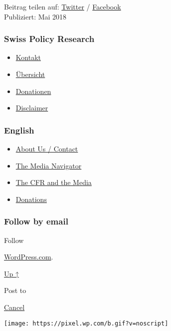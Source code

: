 Beitrag teilen auf:
\href{https://twitter.com/intent/tweet?url=https://swprs.org/logik-imperialer-kriege/}{Twitter}
/
\href{https://www.facebook.com/share.php?u=https://swprs.org/logik-imperialer-kriege/}{Facebook}\\
Publiziert: Mai 2018

\hypertarget{swiss-policy-research}{%
\subsubsection{Swiss Policy Research}\label{swiss-policy-research}}

\begin{itemize}
\tightlist
\item
  \href{https://swprs.org/kontakt/}{Kontakt}
\item
  \href{https://swprs.org/uebersicht/}{Übersicht}
\item
  \href{https://swprs.org/donationen/}{Donationen}
\item
  \href{https://swprs.org/disclaimer/}{Disclaimer}
\end{itemize}

\hypertarget{english}{%
\subsubsection{English}\label{english}}

\begin{itemize}
\tightlist
\item
  \href{https://swprs.org/contact/}{About Us / Contact}
\item
  \href{https://swprs.org/media-navigator/}{The Media Navigator}
\item
  \href{https://swprs.org/the-american-empire-and-its-media/}{The CFR
  and the Media}
\item
  \href{https://swprs.org/donations/}{Donations}
\end{itemize}

\hypertarget{follow-by-email}{%
\subsubsection{Follow by email}\label{follow-by-email}}

Follow

\href{https://wordpress.com/?ref=footer_custom_com}{WordPress.com}.

\protect\hyperlink{}{Up ↑}

Post to

\protect\hyperlink{}{Cancel}

\texttt{[image: https://pixel.wp.com/b.gif?v=noscript]}

